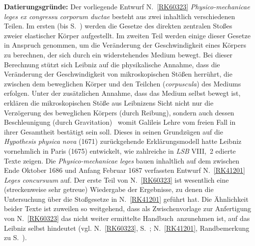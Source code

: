 \begin{ledgroup}
\footnotesize
\pstart
\noindent%
\textbf{Datierungsgründe:}
Der vorliegende Entwurf N.~\ref{RK60323} \textit{Physico-mechanicae leges ex congressu corporum ductae} besteht aus zwei inhaltlich verschiedenen Teilen.
Im ersten (bis S.~) werden die Gesetze des direkten zentralen Stoßes zweier elastischer Körper aufgestellt.
Im zweiten Teil werden einige dieser Gesetze in Anspruch genommen, um die Veränderung der Geschwindigkeit eines Körpers zu berechnen, der sich durch ein widerstehendes Medium bewegt.
Bei dieser Berechnung stützt sich Leibniz auf die physikalische Annahme, dass die Veränderung der Geschwindigkeit von mikroskopischen Stößen herrührt, die zwischen dem beweglichen Körper und den Teilchen (\textit{corpuscula}) des Mediums erfolgen.
Unter der zusätzlichen Annahme, dass das Medium selbst bewegt ist, erklären die mikroskopischen Stöße aus Leibnizens Sicht nicht nur die Verzögerung des beweglichen Körpers (durch Reibung), sondern auch dessen Beschleunigung (durch Gravitation) \textendash\ womit Galileis\protect{}
Lehre vom freien Fall in ihrer Gesamtheit bestätigt sein soll.
Dieses in seinen Grundzügen auf die \textit{Hypothesis physica nova}\cite{00256} (1671) zurückgehende Erklärungsmodell hatte Leibniz vornehmlich in Paris (1675) entwickelt, wie zahlreiche in \textit{LSB} VIII,~2 edierte Texte zeigen.
\pend\pstart
Die \textit{Physico-mechanicae leges} bauen inhaltlich auf dem zwischen Ende Oktober 1686 und Anfang Februar 1687 verfassten Entwurf N.~\ref{RK41201} \textit{Leges concursuum} auf.
Der erste Teil von N.~\ref{RK60323} ist wesentlich eine (streckenweise sehr getreue) Wiedergabe der Ergebnisse, zu denen die Untersuchung über die Stoßgesetze in N.~\ref{RK41201} geführt hat.
Die Ähnlichkeit beider Texte ist zuweilen so weitgehend, dass als Zwischenvorlage zur Anfertigung von N.~\ref{RK60323} das nicht weiter ermittelte \glqq Handbuch\grqq\ anzunehmen ist, auf das Leibniz selbst hindeutet (vgl. N.~\ref{RK60323}, S.~; N.~\ref{RK41201}, Randbemerkung zu S.~).

\end{ledgroup}
